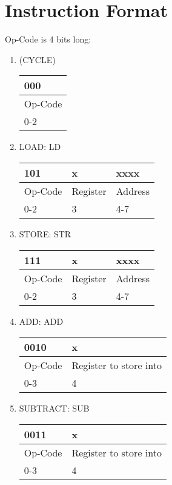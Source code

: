 \documentclass{article}
\begin{document}
\section{Instruction Format}
Op-Code is 4 bits long:
\begin{enumerate}
\item (CYCLE)\\
\begin{tabularx}{\textwidth}{|X|}
	\hline 000
	\\ \hline Op-Code
	\\ \hline 0-2
	\\ \hline
\end{tabularx}

\item LOAD: LD\\
  \begin{tabularx}{\textwidth}{|X|X|X|}
    \hline 101 & x & xxxx
    \\ \hline Op-Code & Register & Address
    \\ \hline 0-2 & 3 & 4-7
    \\ \hline
  \end{tabularx}

\item STORE: STR\\
  \begin{tabularx}{\textwidth}{|X|X|X|}
    \hline 111 & x & xxxx
    \\ \hline Op-Code & Register & Address
    \\ \hline 0-2 & 3 & 4-7
    \\ \hline
  \end{tabularx}

\item ADD: ADD\\
  \begin{tabularx}{\textwidth}{|X|X|}
    \hline 0010 & x
    \\ \hline Op-Code & Register to store into
    \\ \hline 0-3 & 4
    \\ \hline
  \end{tabularx}

\item SUBTRACT: SUB\\
  \begin{tabularx}{\textwidth}{|X|X|}
    \hline 0011 & x
    \\ \hline Op-Code & Register to store into
    \\ \hline 0-3 & 4
    \\ \hline
  \end{tabularx}
  

\end{enumerate}
\end{document}
